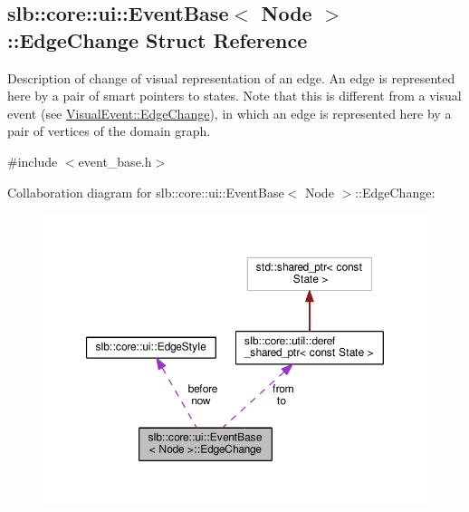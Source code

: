 \hypertarget{structslb_1_1core_1_1ui_1_1EventBase_1_1EdgeChange}{}\subsection{slb\+:\+:core\+:\+:ui\+:\+:Event\+Base$<$ Node $>$\+:\+:Edge\+Change Struct Reference}
\label{structslb_1_1core_1_1ui_1_1EventBase_1_1EdgeChange}


Description of change of visual representation of an edge. An edge is represented here by a pair of smart pointers to states. Note that this is different from a visual event (see \hyperlink{structslb_1_1core_1_1ui_1_1VisualEvent_1_1EdgeChange}{Visual\+Event\+::\+Edge\+Change}), in which an edge is represented here by a pair of vertices of the domain graph.  




{\ttfamily \#include $<$event\+\_\+base.\+h$>$}



Collaboration diagram for slb\+:\+:core\+:\+:ui\+:\+:Event\+Base$<$ Node $>$\+:\+:Edge\+Change\+:\nopagebreak
\begin{figure}[H]
\begin{center}
\leavevmode
\includegraphics[width=350pt]{structslb_1_1core_1_1ui_1_1EventBase_1_1EdgeChange__coll__graph}
\end{center}
\end{figure}
